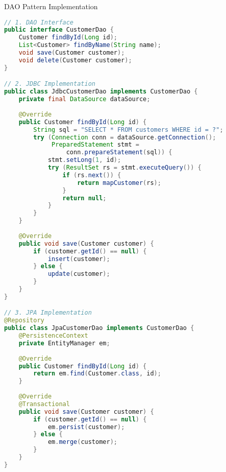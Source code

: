 \begin{example}{DAO Pattern Implementation}
\begin{lstlisting}[language=Java]
// 1. DAO Interface
public interface CustomerDao {
    Customer findById(Long id);
    List<Customer> findByName(String name);
    void save(Customer customer);
    void delete(Customer customer);
}

// 2. JDBC Implementation
public class JdbcCustomerDao implements CustomerDao {
    private final DataSource dataSource;
    
    @Override
    public Customer findById(Long id) {
        String sql = "SELECT * FROM customers WHERE id = ?";
        try (Connection conn = dataSource.getConnection();
             PreparedStatement stmt = 
                 conn.prepareStatement(sql)) {
            stmt.setLong(1, id);
            try (ResultSet rs = stmt.executeQuery()) {
                if (rs.next()) {
                    return mapCustomer(rs);
                }
                return null;
            }
        }
    }
    
    @Override
    public void save(Customer customer) {
        if (customer.getId() == null) {
            insert(customer);
        } else {
            update(customer);
        }
    }
}

// 3. JPA Implementation
@Repository
public class JpaCustomerDao implements CustomerDao {
    @PersistenceContext
    private EntityManager em;
    
    @Override
    public Customer findById(Long id) {
        return em.find(Customer.class, id);
    }
    
    @Override
    @Transactional
    public void save(Customer customer) {
        if (customer.getId() == null) {
            em.persist(customer);
        } else {
            em.merge(customer);
        }
    }
}
\end{lstlisting}
\end{example}

